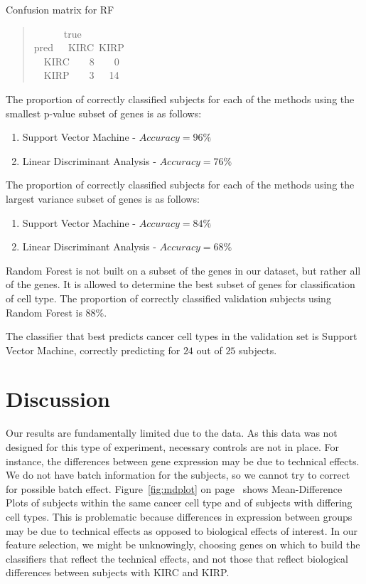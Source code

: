 Confusion matrix for RF
\vspace*{\fill}
\begin{quote}{ \ttfamily \raggedright \noindent
\centering
~~~~~~true\\
pred~~~KIRC~KIRP\\
~~KIRC~~~~8~~~~0\\
~~KIRP~~~~3~~~14\\
}
\end{quote}
\vspace*{\fill}

The proportion of correctly classified subjects for each of the methods using
the smallest p-value subset of genes is as follows:

\begin{enumerate}
\item Support Vector Machine - $Accuracy = 96\%$
\item Linear Discriminant Analysis - $Accuracy = 76\%$
\end{enumerate}

The proportion of correctly classified subjects for each of the methods using
the largest variance subset of genes is as follows:

\begin{enumerate}
\item Support Vector Machine - $Accuracy = 84\% $
\item Linear Discriminant Analysis - $Accuracy =68\% $
\end{enumerate}

Random Forest is not built on a subset of the genes in our dataset, but rather
all of the genes. It is allowed to determine the best subset of genes for
classification of cell type. The proportion of correctly classified validation
subjects using Random Forest is $88\%$.

The classifier that best predicts cancer cell types in the validation set is
Support Vector Machine, correctly predicting for $24$ out of $25$ subjects.

\section{Discussion}

Our results are fundamentally limited due to the data. As this data was not
designed for this type of experiment, necessary controls are not in place. For
instance, the differences between gene expression may be due to technical
effects. We do not have batch information for the subjects, so we cannot try to
correct for possible batch effect. Figure~\ref{fig:mdplot} on
page~\pageref{fig:mdplot} shows Mean-Difference Plots of subjects within the
same cancer cell type and of subjects with differing cell types.  This is
problematic because differences in expression between groups may be due to
technical effects as opposed to biological effects of interest.  In our feature
selection, we might be unknowingly, choosing genes on which to build the
classifiers that reflect the technical effects, and not those that reflect
biological differences between subjects with KIRC and KIRP.

